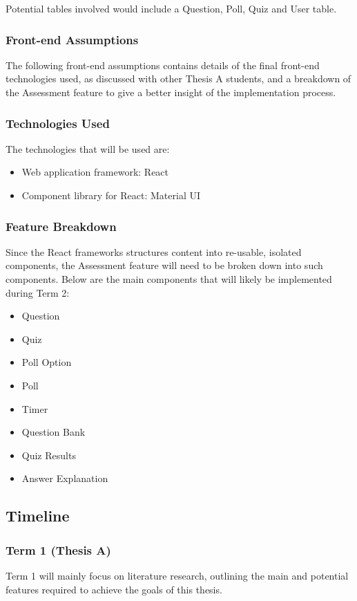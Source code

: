 Potential tables involved would include a Question, Poll, Quiz and User table. 


\subsubsection{Front-end Assumptions}
The following front-end assumptions contains details of the final front-end technologies used, as discussed with other Thesis A students, and a breakdown of the Assessment feature to give a better insight of the implementation process.

\subsubsection{Technologies Used}
The technologies that will be used are:
\begin{itemize}
	\item Web application framework: React
	\item Component library for React: Material UI
\end{itemize}

\subsubsection{Feature Breakdown}
Since the React frameworks structures content into re-usable, isolated components, the Assessment feature will need to be broken down into such components. Below are the main components that will likely be implemented during Term 2:
\begin{itemize}
	\item Question
	\item Quiz
	\item Poll Option
	\item Poll
	\item Timer
	\item Question Bank
	\item Quiz Results
	\item Answer Explanation
\end{itemize}


\subsection{Timeline}
\subsubsection{Term 1 (Thesis A)}
Term 1 will mainly focus on literature research, outlining the main and potential features required to achieve the goals of this thesis.\\

